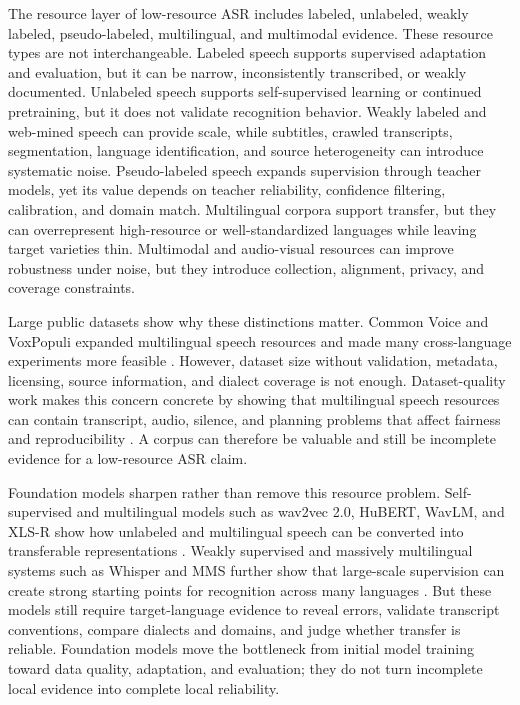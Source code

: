 \documentclass[pdflatex,sn-basic,iicol]{sn-jnl}
\theoremstyle{thmstyleone}
\theoremstyle{thmstyletwo}
\theoremstyle{thmstylethree}
\begin{document}
The resource layer of low-resource ASR includes labeled, unlabeled, weakly labeled, pseudo-labeled, multilingual, and multimodal evidence. These resource types are not interchangeable. Labeled speech supports supervised adaptation and evaluation, but it can be narrow, inconsistently transcribed, or weakly documented. Unlabeled speech supports self-supervised learning or continued pretraining, but it does not validate recognition behavior. Weakly labeled and web-mined speech can provide scale, while subtitles, crawled transcripts, segmentation, language identification, and source heterogeneity can introduce systematic noise. Pseudo-labeled speech expands supervision through teacher models, yet its value depends on teacher reliability, confidence filtering, calibration, and domain match. Multilingual corpora support transfer, but they can overrepresent high-resource or well-standardized languages while leaving target varieties thin. Multimodal and audio-visual resources can improve robustness under noise, but they introduce collection, alignment, privacy, and coverage constraints.

Large public datasets show why these distinctions matter. Common Voice and VoxPopuli expanded multilingual speech resources and made many cross-language experiments more feasible \citep{ardila2020commonvoice,wang2021voxpopuli}. However, dataset size without validation, metadata, licensing, source information, and dialect coverage is not enough. Dataset-quality work makes this concern concrete by showing that multilingual speech resources can contain transcript, audio, silence, and planning problems that affect fairness and reproducibility \citep{lau2025_data_quality_multilingual_speech}. A corpus can therefore be valuable and still be incomplete evidence for a low-resource ASR claim.

Foundation models sharpen rather than remove this resource problem. Self-supervised and multilingual models such as wav2vec 2.0, HuBERT, WavLM, and XLS-R show how unlabeled and multilingual speech can be converted into transferable representations \citep{baevski2020wav2vec2,hsu2021hubert,chen2022wavlm,babu22_interspeech}. Weakly supervised and massively multilingual systems such as Whisper and MMS further show that large-scale supervision can create strong starting points for recognition across many languages \citep{pmlr-v202-radford23a,pratap2024mms}. But these models still require target-language evidence to reveal errors, validate transcript conventions, compare dialects and domains, and judge whether transfer is reliable. Foundation models move the bottleneck from initial model training toward data quality, adaptation, and evaluation; they do not turn incomplete local evidence into complete local reliability.
\end{document}
